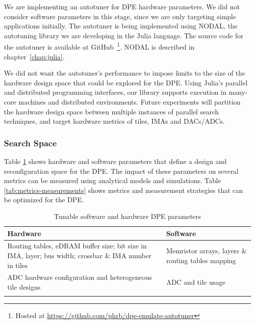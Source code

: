 We are implementing an autotuner for DPE hardware parameters.  We did not
consider software parameters in this stage, since we are only targeting simple
applications initially. The autotuner is being implemented using NODAL, the
autotuning library we are developing in the Julia language. The source code for
the autotuner is available at GitHub~\footnote{Hosted at
\url{https://github.com/phrb/dpe-emulate-autotuner}}. NODAL is described in
chapter~\ref{chap:julia}.

We did not want the autotuner's performance to impose limits to the size of the
hardware design space that could be explored for the DPE. Using Julia's
parallel and distributed programming interfaces, our library supports execution
in many-core machines and distributed environments. Future experiments will
partition the hardware design space between multiple instances of parallel
search techniques, and target hardware metrics of tiles, IMAs and DACs/ADCs.

\subsubsection{Search Space}

Table \ref{tab:hard-soft-params} shows hardware and software parameters that
define a design and reconfiguration space for the DPE. The impact of these
parameters on several metrics can be measured using analytical models and
simulations.  Table \ref{tab:metrics-measurements} shows metrics and
measurement strategies that can be optimized for the DPE.

\begin{table}[htpb]
\centering
\begin{tabular}{@{}p{}p{}@{}}
\toprule
\textbf{Hardware} & \textbf{Software} \\ \midrule
Routing tables, eDRAM buffer size; bit size in IMA, layer; bus width; crossbar \& IMA number in tiles & Memristor arrays, layers \& routing tables mapping  \\
\addlinespace
ADC hardware configuration and heterogeneous tile designs & ADC and tile usage \\ \bottomrule
\addlinespace
\end{tabular}
\caption{Tunable software and hardware DPE parameters
}
\label{tab:hard-soft-params}
\end{table}


